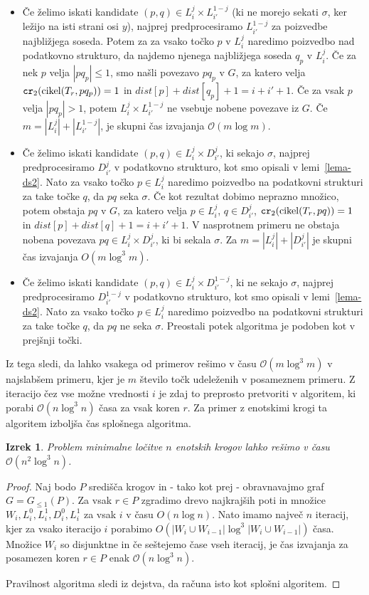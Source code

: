 \documentclass[a4paper, 12pt]{book}
\newcommand{\GG}{\ensuremath{G_{\le 1}}}
\newcommand{\OO}{\ensuremath{\mathcal{O}}} %
\newtheorem{izrek}{Izrek}[chapter]
\def\dist{\mathit{dist}}
\newcommand\CR{\mbox{\tt cr}_2}		  %
\begin{document}
\begin{itemize}
\item Če želimo iskati kandidate $(p,q)\in L_i^j\times L_{i'}^{1-j}$ (ki ne morejo sekati $\sigma$, ker ležijo na isti strani osi $y$), najprej predprocesiramo $L_{i'}^{1-j}$ za poizvedbe najbližjega soseda. Potem za za vsako točko $p$ v $L_i^j$ naredimo poizvedbo nad podatkovno strukturo, da najdemo njenega najbližjega soseda $q_p$ v $L_i^j$. Če za nek $p$ velja $|pq_p|\le 1$, smo našli povezavo $pq_p$ v $G$, za katero velja $\CR(\operatorname{cikel}(T_r,pq_p))=1$ in $\dist[p]+\dist[q_p]+1=i+i'+1$. Če za vsak $p$ velja $|pq_p|> 1$, potem $L_i^j\times L_{i'}^{1-j}$ ne vsebuje nobene povezave iz $G$. Če $m=|L_i^j|+|L_{i'}^{1-j}|$, je skupni čas izvajanja $\OO(m\log m)$.
\item Če želimo iskati kandidate $(p,q)\in L_i^j\times D_{i'}^{j}$, ki sekajo $\sigma$, najprej predprocesiramo $D_{i'}^{j}$ v podatkovno strukturo, kot smo opisali v lemi~\ref{lema-ds2}. Nato za vsako točko $p\in L_i^j$ naredimo poizvedbo na podatkovni strukturi za take točke $q$, da $pq$ seka $\sigma$. Če kot rezultat dobimo neprazno množico, potem obstaja $pq$ v $G$, za katero velja $p\in L_i^j$, $q\in D_{i'}^{j}$, $\CR(\operatorname{cikel}(T_r,pq))=1$ in $\dist[p]+\dist[q]+1=i+i'+1$. V nasprotnem primeru ne obstaja nobena povezava $pq\in L_i^j\times D_{i'}^{j}$, ki bi sekala $\sigma$. Za $m=|L_i^j|+|D_{i'}^{j}|$ je skupni čas izvajanja  $O(m\log^3 m)$.
\item Če želimo iskati kandidate $(p,q)\in L_i^j\times D_{i'}^{1-j}$, ki ne sekajo $\sigma$, najprej predprocesiramo $D_{i'}^{1-j}$ v podatkovno strukturo, kot smo opisali v lemi~\ref{lema-ds2}. Nato za vsako točko $p\in L_i^j$ naredimo poizvedbo na podatkovni strukturi za take točke $q$, da $pq$ ne seka $\sigma$. Preostali potek algoritma je podoben kot v prejšnji točki. 
\end{itemize}
Iz tega sledi, da lahko vsakega od primerov rešimo v času $\OO(m\log^3m)$ v najslabšem primeru, kjer je $m$ število točk udeleženih v posameznem primeru. Z iteracijo čez vse možne vrednosti $i$ je zdaj to preprosto pretvoriti v algoritem, ki porabi $\OO(n\log^3n)$ časa za vsak koren $r$. Za primer z enotskimi krogi ta algoritem izboljša čas splošnega algoritma. 
\begin{izrek}
\label{lema4}
Problem minimalne ločitve $n$ enotskih krogov lahko rešimo v času $\OO(n^2\log^3n)$.
\end{izrek}

\begin{proof}
Naj bodo $P$ središča krogov in - tako kot prej - obravnavajmo graf $G=\GG(P)$. Za vsak $r\in P$ zgradimo drevo najkrajših poti in množice $W_i,L_i^0,L_i^1,D_i^0,L_i^1$ za vsak $i$ v času $O(n\log n)$. Nato imamo največ $n$ iteracij, kjer za vsako iteracijo $i$ porabimo $O(|W_i\cup W_{i-1}|\log^3 |W_i\cup W_{i-1}|)$ časa. Množice $W_i$ so disjunktne in če seštejemo čase vseh iteracij, je čas izvajanja za posamezen koren $r\in P$ enak $\OO(n\log^3n)$.

Pravilnost algoritma sledi iz dejstva, da računa isto kot splošni algoritem.
\end{proof}
\end{document}
